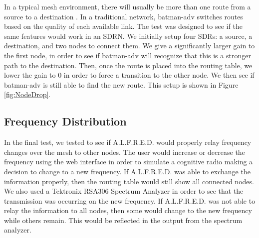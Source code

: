 In a typical mesh environment, there will usually be more than one route from a source to a destination \cite{Akyildiz2009810}. In a traditional network, batman-adv switches routes based on the quality of each available link. The test was designed to see if the same features would work in an SDRN. We initially setup four SDRs: a source, a destination, and two nodes to connect them. We give a significantly larger gain to the first node, in order to see if batman-adv will recognize that this is a stronger path to the destination. Then, once the route is placed into the routing table, we lower the gain to 0 in order to force a transition to the other node. We then see if batman-adv is still able to find the new route. This setup is shown in Figure \ref{fig:NodeDrop}.



\subsection{Frequency Distribution}

In the final test, we tested to see if A.L.F.R.E.D. would properly relay frequency changes over the mesh to other nodes. The user would increase or decrease the frequency using the web interface in order to simulate a cognitive radio making a decision to change to a new frequency. If A.L.F.R.E.D. was able to exchange the information properly, then the routing table would still show all connected nodes. We also used a Tektronix RSA306 Spectrum Analyzer in order to see that the transmission was occurring on the new frequency. If A.L.F.R.E.D. was not able to relay the information to all nodes, then some would change to the new frequency while others remain. This would be reflected in the output from the spectrum analyzer. 